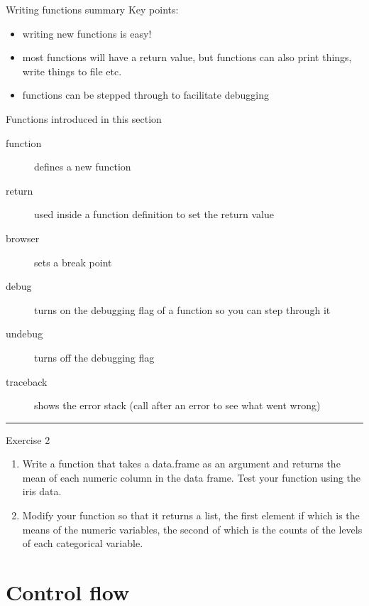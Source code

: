 \documentclass[table,smaller]{beamer}
\begin{document}
\begin{frame}[label=sec-5-5]{Writing functions summary}
Key points:
\begin{itemize}
\item writing new functions is easy!
\item most functions will have a return value, but functions can also print things, write things to file etc.
\item functions can be stepped through to facilitate debugging
\end{itemize}
Functions introduced in this section  
\begin{description}
\item[{function}] defines a new function
\item[{return}] used inside a function definition to set the return value
\item[{browser}] sets a break point
\item[{debug}] turns on the debugging flag of a function so you can step through it
\item[{undebug}] turns off the debugging flag
\item[{traceback}] shows the error stack (call after an error to see what went wrong)
\end{description}


\rule{\linewidth}{0.5pt}
\end{frame}
\begin{frame}[label=sec-5-6]{Exercise 2}
\begin{enumerate}
\item Write a function that takes a data.frame as an argument and returns the mean of each numeric column in the data frame. Test your function using the iris data.

\item Modify your function so that it returns a list, the first element if which is the means of the numeric variables, the second of which is the counts of the levels of each categorical variable.
\end{enumerate}
\end{frame}
\section{Control flow}
\label{sec-6}
\end{document}
